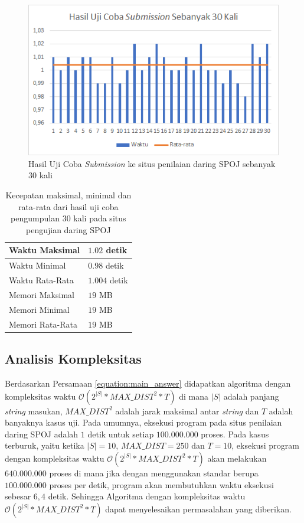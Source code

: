 \documentclass[a4paper]{IEEEtran}
\begin{document}
\begin{figure}[h]
	\centering
	\includegraphics[width=\linewidth]{submission-chart.png}
	\caption{Hasil Uji Coba \textit{Submission} ke situs penilaian daring SPOJ sebanyak 30 kali}
	\label{figure:chart}
\end{figure}

\begin{table}
	\centering
	\begin{tabular}{|l|l|} \hline
		Waktu Maksimal & $ 1.02 $ detik\\ \hline
		Waktu Minimal & $ 0.98 $ detik\\ \hline
		Waktu Rata-Rata & $ 1.004 $ detik\\ \hline
		Memori Maksimal & $ 19 $ MB\\ \hline
		Memori Minimal & $ 19 $ MB\\ \hline
		Memori Rata-Rata & $ 19 $ MB\\ \hline
	\end{tabular}
	\caption{Kecepatan maksimal, minimal dan rata-rata dari hasil uji coba pengumpulan 30 kali pada situs pengujian daring SPOJ}
	\label{tab:statistik}
\end{table}


\subsection{Analisis Kompleksitas}
Berdasarkan Persamaan \ref{equation:main_answer} didapatkan algoritma dengan kompleksitas waktu $ \mathcal{O}(2^{|S|} * MAX\_DIST^{2} * T) $ di mana $ |S| $ adalah panjang \textit{string} masukan, $ MAX\_DIST^{2} $ adalah jarak maksimal antar \textit{string} dan $ T $ adalah banyaknya kasus uji. Pada umumnya, eksekusi program pada situs penilaian daring SPOJ adalah $ 1 $ detik untuk setiap $ 100.000.000 $ proses. Pada kasus terburuk, yaitu ketika $ |S|=10 $, $ MAX\_DIST=250 $ dan $ T=10 $, eksekusi program dengan kompleksitas waktu $ \mathcal{O}(2^{|S|} * MAX\_DIST^{2} * T) $ akan melakukan $ 640.000.000 $ proses di mana jika dengan menggunakan standar berupa $ 100.000.000 $ proses per detik, program akan membutuhkan waktu eksekusi sebesar $ 6,4 $ detik. Sehingga Algoritma dengan kompleksitas waktu $ \mathcal{O}(2^{|S|} * MAX\_DIST^{2} * T) $ dapat menyelesaikan permasalahan yang diberikan.
\end{document}
